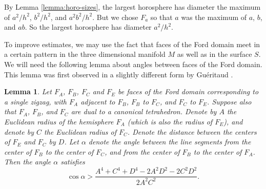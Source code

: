 \documentclass[11pt]{amsart}
\theoremstyle{plain}
\newtheorem{lemma}[theorem]{Lemma}
\theoremstyle{definition}
\begin{document}
By Lemma \ref{lemma:horo-sizes}, the largest horosphere has diameter
the maximum of $a^2/h^2$, $b^2/h^2$, and $a^2b^2/h^2$.  But we chose
$F_a$ so that $a$ was the maximum of $a$, $b$, and $ab$.  So the
largest horosphere has diameter $a^2/h^2$.

To improve estimates, we may use the fact that faces of the Ford
domain meet in a certain pattern in the three dimensional manifold $M$
as well as in the surface $S$.  We will need the following lemma about
angles between faces of the Ford domain.  This lemma was first
observed in a slightly different form by Gu{\'e}ritaud \cite[Page
29]{gueritaud:thesis}.


\begin{lemma}\label{lemma:cos-bound}
Let $F_A$, $F_B$, $F_C$ and $F_E$ be faces of the Ford domain
corresponding to a single zigzag, with $F_A$ adjacent to $F_B$, $F_B$
to $F_C$, and $F_C$ to $F_E$.  Suppose also that $F_A$, $F_B$, and
$F_C$ are dual to a canonical tetrahedron.  Denote by $A$ the
Euclidean radius of the hemisphere $F_A$ (which is also the radius of
$F_E$), and denote by $C$ the Euclidean radius of $F_C$.  Denote the
distance between the centers of $F_E$ and $F_C$ by $D$.  Let $\alpha$
denote the angle between the line segments from the center of $F_B$ to
the center of $F_C$, and from the center of $F_B$ to the center of
$F_A$.  Then the angle $\alpha$ satisfies
$$\cos{\alpha} >
 \frac{ A^4 + C^4 + D^4 - 2A^2 D^2 - 2 C^2 D^2}
			{2 A^2 C^2}.$$  
\end{lemma}
\end{document}
